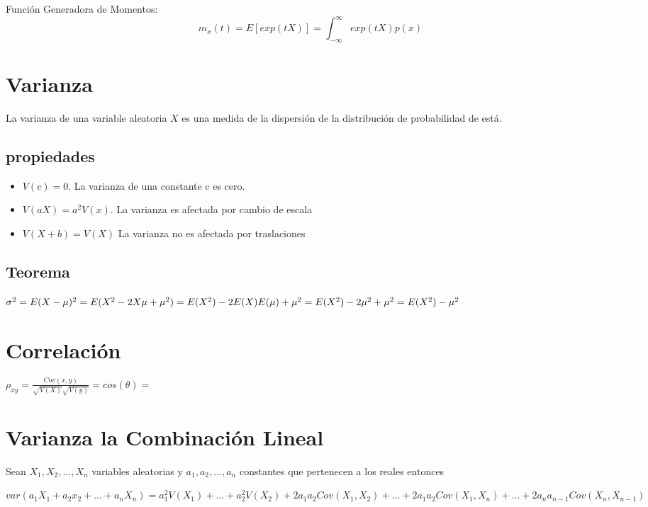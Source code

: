 \documentclass{book}
\begin{document}
Función Generadora de Momentos:
$$m_x(t)=E[exp(tX)]=\int_{-\infty}^\infty exp(tX)p(x)$$

\section{Varianza}
La varianza de una variable aleatoria $X$ es una medida  de la dispersión de la distribución de probabilidad de está.\\
 

\subsection{propiedades}

\begin{itemize}
    \item $V(c) = 0$. La varianza de una constante c es cero.
    \item $V(aX) = a^2V(x)$. La varianza es afectada por cambio de escala
    \item $V(X+b) = V(X)$ La varianza no es afectada por traslaciones
\end{itemize}

\subsection{Teorema}

$\sigma^2=  E(X-\mu)^2 \\
 = E(X^2 - 2X\mu +\mu^2) \\
 =E(X^2)-2E(X)E(\mu) + \mu^2\\
 =E(X^2)-2\mu^2 +\mu^2 \\
 =E(X^2)- \mu^2$

\section{Correlación}

$\rho_{xy}= \frac{Cov(x,y)}{\sqrt{V(X)}\sqrt{V(y)}} = cos (\theta) = \frac{}{}$


\section{Varianza  la Combinación Lineal}
Sean $X_1, X_2, ..., X_n $ variables aleatorias y $a_1,a_2,..., a_n$ constantes que pertenecen a los reales entonces

$var(a_1X_1+a_2x_2+...+a_nX_n) = a_1^2 V(X_1) + ... + a_2^2 V(X_2) + 2a_1a_2 Cov(X_1,X_2) + ... +  2a_1a_2 Cov(X_1,X_n)+...+ 2a_n a_{n-1} Cov(X_n,X_{n-1})$
\end{document}
